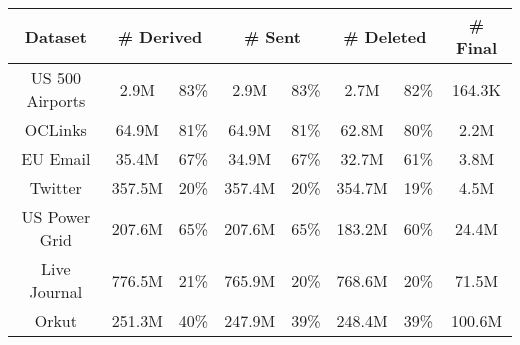 \begin{tabular}{c || c | c | c | c | c | c | c} \hline
	\textbf{Dataset} & \multicolumn{2}{c|}{\textbf{\# Derived}} & \multicolumn{2}{c|}{\textbf{\# Sent}} & \multicolumn{2}{c|}{\textbf{\# Deleted}} & \textbf{\# Final} \\ \hline \hline
US 500 Airports & 2.9M  &  83\%  & 2.9M &  83\%  & 2.7M &  82\%  & 164.3K \\
OCLinks & 64.9M  &  81\%  & 64.9M &  81\%  & 62.8M &  80\%  & 2.2M \\
EU Email & 35.4M  &  67\%  & 34.9M &  67\%  & 32.7M &  61\%  & 3.8M \\
Twitter & 357.5M  &  20\%  & 357.4M &  20\%  & 354.7M &  19\%  & 4.5M \\
US Power Grid & 207.6M  &  65\%  & 207.6M &  65\%  & 183.2M &  60\%  & 24.4M \\
Live Journal & 776.5M  &  21\%  & 765.9M &  20\%  & 768.6M &  20\%  & 71.5M \\
Orkut & 251.3M  &  40\%  & 247.9M &  39\%  & 248.4M &  39\%  & 100.6M \\
	\hline
\end{tabular}
